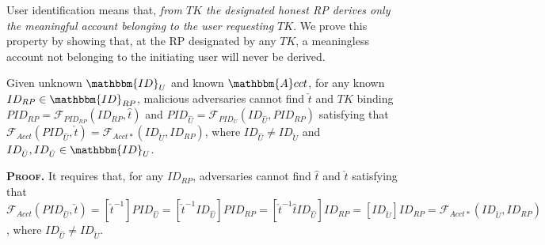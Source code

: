 





User identification means that,
\emph{from $TK$ the designated honest RP derives only the meaningful account belonging to the user requesting $TK$}.
We prove this property by showing that,
    at the RP designated by any $TK$,
        a meaningless account not belonging to the initiating user will never be derived.

\vspace{1.5mm}
\begin{thm} Given unknown $\mathbbm{ID}_U$ and known $\mathbbm{A}cct$,
for any known $ID_{RP} \in \mathbbm{ID}_{RP}$, 
     malicious adversaries cannot find $\check{t}$ and $TK$ binding $PID_{RP} = \mathcal{F}_{PID_{RP}}(ID_{RP}, \hat{t})$
     and $PID_{\hat{U}}=\mathcal{F}_{PID_U}(ID_{\hat{U}}, PID_{RP})$ satisfying that $\mathcal{F}_{Acct}(PID_{\hat{U}}, \check{t}) = \mathcal{F}_{Acct\ast}(ID_{\check{U}}, ID_{RP})$, where $ID_{\hat{U}} \neq ID_{\check{U}}$ and $ID_{\hat{U}},ID_{\check{U}} \in \mathbbm{ID}_U$.
\label{thm-u-id}
\end{thm}

\noindent\textbf{\textsc{Proof.}}
It requires that, for any $ID_{RP}$, adversaries cannot find $\hat{t}$ and $\check{t}$ satisfying that $\mathcal{F}_{Acct}(PID_{\hat{U}}, \check{t}) = [\check{t}^{-1}]PID_{\hat{U}} = [\check{t}^{-1}ID_{\hat{U}}]PID_{RP}
= [\check{t}^{-1}\hat{t}ID_{\hat{U}}]ID_{RP}
    = [ID_{\check{U}}]ID_{RP} = \mathcal{F}_{Acct\ast}(ID_{\check{U}}, ID_{RP})$,
where $ID_{\hat{U}} \neq ID_{\check{U}}$.

